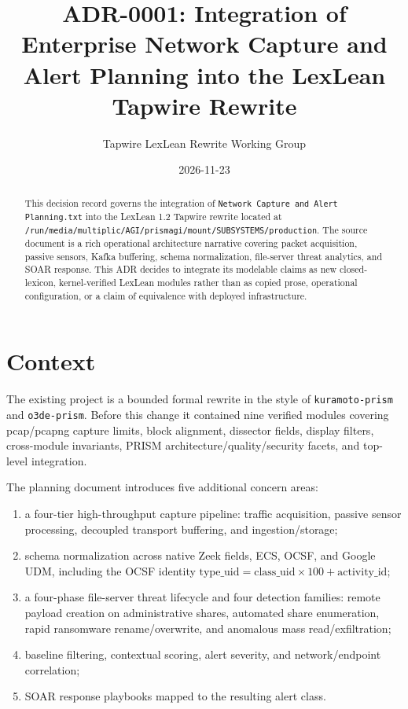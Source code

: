 \documentclass[11pt]{article}
\title{ADR-0001: Integration of Enterprise Network Capture and Alert Planning into the LexLean Tapwire Rewrite}
\author{Tapwire LexLean Rewrite Working Group}
\date{2026-11-23}
\begin{document}
\maketitle

\begin{abstract}
This decision record governs the integration of
\texttt{Network Capture and Alert Planning.txt} into the LexLean 1.2 Tapwire rewrite located at
\texttt{/run/media/multiplic/AGI/prismagi/mount/SUBSYSTEMS/production}. The source document is a
rich operational architecture narrative covering packet acquisition, passive sensors, Kafka
buffering, schema normalization, file-server threat analytics, and SOAR response. This ADR decides
to integrate its modelable claims as new closed-lexicon, kernel-verified LexLean modules rather than
as copied prose, operational configuration, or a claim of equivalence with deployed infrastructure.
\end{abstract}

\section{Context}

The existing project is a bounded formal rewrite in the style of \texttt{kuramoto-prism} and
\texttt{o3de-prism}. Before this change it contained nine verified modules covering pcap/pcapng
capture limits, block alignment, dissector fields, display filters, cross-module invariants, PRISM
architecture/quality/security facets, and top-level integration.

The planning document introduces five additional concern areas:

\begin{enumerate}
  \item a four-tier high-throughput capture pipeline: traffic acquisition, passive sensor
        processing, decoupled transport buffering, and ingestion/storage;
  \item schema normalization across native Zeek fields, ECS, OCSF, and Google UDM, including the
        OCSF identity $\mathrm{type\_uid} = \mathrm{class\_uid}\times 100 + \mathrm{activity\_id}$;
  \item a four-phase file-server threat lifecycle and four detection families: remote payload
        creation on administrative shares, automated share enumeration, rapid ransomware
        rename/overwrite, and anomalous mass read/exfiltration;
  \item baseline filtering, contextual scoring, alert severity, and network/endpoint correlation;
  \item SOAR response playbooks mapped to the resulting alert class.
\end{enumerate}
\end{document}
